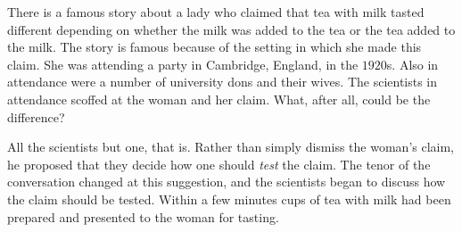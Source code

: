There is a famous story about a lady who claimed that
tea with milk tasted different depending on whether the milk was 
added to the tea or the tea added to the milk.
The story is famous because of the setting in which she made this claim.  
She was attending a party in Cambridge, England, in the $1920$s.
Also in attendance were a number of university dons and their wives.
The scientists in attendance scoffed at the woman and her claim.
What, after all, could be the difference?

%
All the scientists but one, that is.  Rather than simply dismiss the 
woman's claim, he proposed that they decide how one 
should \emph{test} the claim.  The tenor of the conversation changed at 
this suggestion, and the scientists began to discuss how the claim should be 
tested.  Within a few minutes cups of tea with milk had been prepared and 
presented to the woman for tasting.

